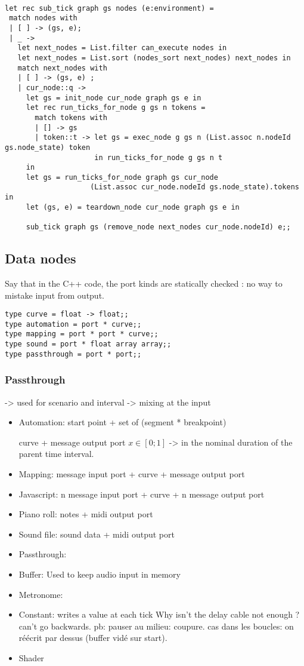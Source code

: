 \documentclass[applsci,article,submit,moreauthors,pdftex,10pt,a4paper]{mdpi}
\begin{document}
\begin{lstlisting}

let rec sub_tick graph gs nodes (e:environment) =
 match nodes with
 | [ ] -> (gs, e);
 | _ ->
   let next_nodes = List.filter can_execute nodes in
   let next_nodes = List.sort (nodes_sort next_nodes) next_nodes in
   match next_nodes with
   | [ ] -> (gs, e) ;
   | cur_node::q ->	
     let gs = init_node cur_node graph gs e in
     let rec run_ticks_for_node g gs n tokens =
       match tokens with
       | [] -> gs
       | token::t -> let gs = exec_node g gs n (List.assoc n.nodeId gs.node_state) token
                     in run_ticks_for_node g gs n t
     in
     let gs = run_ticks_for_node graph gs cur_node 
     				(List.assoc cur_node.nodeId gs.node_state).tokens in
     let (gs, e) = teardown_node cur_node graph gs e in
 
     sub_tick graph gs (remove_node next_nodes cur_node.nodeId) e;;
\end{lstlisting}


\subsection{Data nodes}
Say that in the C++ code, the port kinds are statically checked : no way to mistake input from output.
\begin{lstlisting}
type curve = float -> float;;
type automation = port * curve;;
type mapping = port * port * curve;;
type sound = port * float array array;;
type passthrough = port * port;;
\end{lstlisting}
\subsubsection{Passthrough}
-> used for scenario and interval
-> mixing at the input

\begin{itemize}
\item Automation: 
start point + set of (segment * breakpoint)

curve + message output port
$x\in[0;1]$ -> in the nominal duration of the parent time interval.

\item Mapping: message input port + curve + message output port
\item Javascript:  n message input port + curve + n message output port
\item Piano roll:  notes + midi output port
\item Sound file: sound data + midi output port
\item Passthrough:
\item Buffer: Used to keep audio input in memory
\item Metronome: 
\item Constant: writes a value at each tick
Why isn't the delay cable not enough ? can't go backwards. 
pb: pauser au milieu: coupure. cas dans les boucles: on réécrit par dessus (buffer vidé sur start).
\item Shader
\end{itemize}
\end{document}
